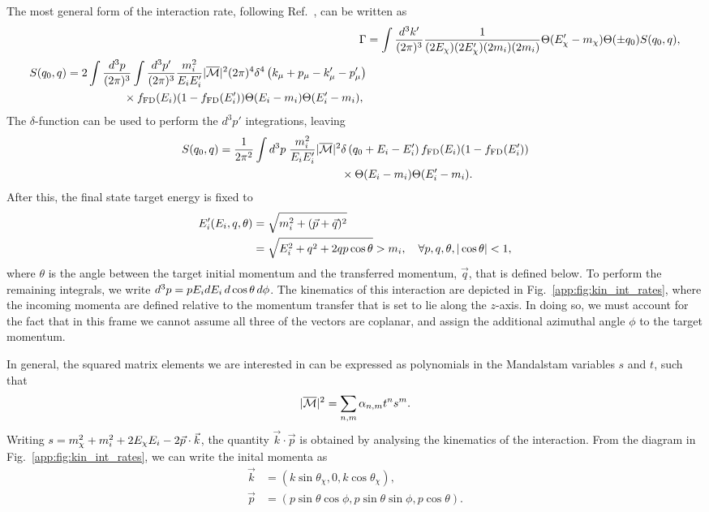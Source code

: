 The most general form of the interaction rate, following Ref.~\cite{Bertoni:2013bsa_dec_DarkMatterThermalization}, can be written as
\begin{align}
    \Gamma &= \int\frac{d^3 k'}{(2\pi)^3}\frac{1}{(2E_\chi)(2E_\chi')(2m_i)(2m_i)}\Theta(E_\chi' - m_\chi)\Theta(\pm q_0)S(q_0, q),\\
    \begin{split}
        S(q_0, q) & = 2\int\frac{d^3 p}{(2\pi)^3}\int\frac{d^3 p'}{(2\pi)^3}\frac{m_i^2}{E_i E_i'}|\overline{\mathcal M}|^2(2\pi)^4\delta^4\left( k_\mu + p_\mu - k_\mu' - p_\mu'\right)\\
        &\hspace{5em}\times f_{\rm FD}(E_i)(1 - f_{\rm FD}(E_i'))\Theta(E_i - m_i)\Theta(E_i' - m_i),
    \end{split}
\end{align}
The $\delta$-function can be used to perform the $d^3p'$ integrations, leaving
\begin{equation}
    \begin{split}
        S(q_0, q) = \frac{1}{2\pi^2}\int d^3p \; \frac{m_i^2}{E_i E_i'}|\overline{\mathcal M}|^2 &\delta\left( q_0 + E_i - E_i'\right) f_{\rm FD}(E_i)(1 - f_{\rm FD}(E_i'))\\
        &\times\Theta(E_i- m_i)\Theta(E_i' - m_i).
    \end{split}
\end{equation}
After this, the final state target energy is fixed to
\begin{align}
    E_i'(E_i,q,\theta) &= \sqrt{m_i^2+(\vec{p}+\vec{q})^2}\\
    &= \sqrt{E_i^2+q^2+2qp\cos\theta} > m_i, \quad\forall p,q,\theta, |\cos\theta|<1,
\end{align}
where $\theta$ is the angle between the target initial momentum and the transferred momentum, $\vec{q}$, that is defined below. To perform the remaining integrals, we write $d^3 p  = p E_i dE_i\, d\cos\theta\,d\phi$. The kinematics of this interaction are depicted in Fig.~\ref{app:fig:kin_int_rates}, where the incoming momenta are defined relative to the momentum transfer that is set to lie along the $z$-axis.  In doing so, we must account for the fact that in this frame we cannot assume all three of the vectors are coplanar, and assign the additional azimuthal angle $\phi$ to the target momentum. 

In general, the squared matrix elements we are interested in can be expressed as polynomials in the Mandalstam variables $s$ and $t$, such that
\begin{equation}
    |\overline{\mathcal M}|^2 = \sum_{n,m}\alpha_{n,m} t^n s^m.
\end{equation}
Writing $s = m_\chi^2 + m_i^2 + 2E_\chi E_i - 2\vec{p}\cdot \vec{k}$, the quantity $\vec{k}\cdot\vec{p}$ is obtained by analysing the kinematics of the interaction. From the diagram in Fig.~\ref{app:fig:kin_int_rates}, we can write the inital momenta as
\begin{align}
    \vec{k} & = (k\sin\theta_\chi, 0, k\cos\theta_\chi),\\
    \vec{p} & = (p\sin\theta \cos\phi, p\sin\theta \sin\phi, p\cos\theta).
\end{align}

